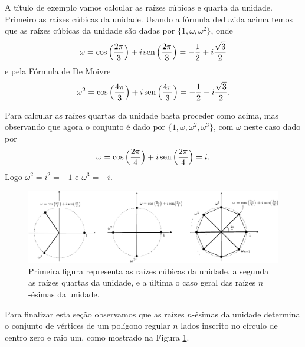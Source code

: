 A título de exemplo vamos calcular as raízes cúbicas e quarta da unidade. 
Primeiro as raízes cúbicas da unidade. 
Usando a fórmula deduzida acima temos que as raízes cúbicas da unidade
são dadas por $\{1,\omega,\omega^2\}$, onde 
\[
\omega 
= 
\cos\Big(\frac{2\pi}{3}\Big)+i\operatorname{sen}\Big(\frac{2\pi}{3}\Big)
=
-\frac{1}{2}+i\frac{\sqrt{3}}{2}
\]
e pela Fórmula de De Moivre 
\[
\omega^2
= 
\cos\Big(\frac{4\pi}{3}\Big)+i\operatorname{sen}\Big(\frac{4\pi}{3}\Big)
=
-\frac{1}{2}-i\frac{\sqrt{3}}{2}.
\]

Para calcular as raízes quartas da unidade basta proceder como acima, mas 
observando que agora o conjunto é dado por $\{1,\omega,\omega^2,\omega^3\}$,
com $\omega$ neste caso dado por 
\[
\omega 
= 
\cos\Big(\frac{2\pi}{4}\Big)+i\operatorname{sen}\Big(\frac{2\pi}{4}\Big)
=
i.
\]
Logo $\omega^2 = i^2 =-1$ e $\omega^{3}=-i$.

\begin{figure}[h]
\centering
\includegraphics[scale=0.6]{Figuras/raizes-da-unidade}
\caption{Primeira figura representa as raízes cúbicas da unidade, a segunda as raízes quartas da unidade, e a última
o caso geral das raízes $n$-ésimas da unidade.}
\label{fig-raizes-unidade}
\end{figure}

\break 

Para finalizar esta seção observamos que as raízes $n$-ésimas da unidade 
determina o conjunto de vértices de um polígono regular $n$ lados inscrito 
no círculo de centro zero e raio um, como mostrado na Figura \ref{fig-raizes-unidade}.

